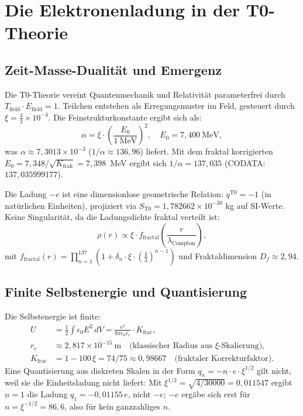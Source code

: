 	\section{Die Elektronenladung in der T0-Theorie}
	\label{sec:t0-ladung}
	
	\subsection{Zeit-Masse-Dualität und Emergenz}
	Die T0-Theorie vereint Quantenmechanik und Relativität parameterfrei durch $T_{\text{field}} \cdot E_{\text{field}} = 1$. Teilchen entstehen als Erregungsmuster im Feld, gesteuert durch $\xi = \frac{4}{3} \times 10^{-4}$. Die Feinstrukturkonstante ergibt sich als:
	\begin{equation}
		\alpha = \xi \cdot \left( \frac{E_0}{1~\mathrm{MeV}} \right)^2, \quad E_0 = 7{,}400~\mathrm{MeV},
	\end{equation}
	was $\alpha \approx 7{,}3013 \times 10^{-3}$ ($1/\alpha \approx 136{,}96$) liefert. Mit dem fraktal korrigierten $E_0 = 7{,}348/\sqrt{K_{\text{frak}}} = 7{,}398$~MeV ergibt sich $1/\alpha = 137{,}035$ (CODATA: $137{,}035999177$).
	
	Die Ladung $-e$ ist eine dimensionlose geometrische Relation: $q^{\mathrm{T0}} = -1$ (in natürlichen Einheiten), projiziert via $S_{\mathrm{T0}} = 1{,}782662 \times 10^{-30}$ kg auf SI-Werte. Keine Singularität, da die Ladungsdichte fraktal verteilt ist:
	\begin{equation}
		\rho(r) \propto \xi \cdot f_{\text{fractal}}\left( \frac{r}{\lambda_{\text{Compton}}} \right),
	\end{equation}
	mit $f_{\text{fractal}}(r) = \prod_{n=1}^{137} \left(1 + \delta_n \cdot \xi \cdot \left(\frac{4}{3}\right)^{n-1}\right)$ und Fraktaldimension $D_f \approx 2{,}94$.
	
	\subsection{Finite Selbstenergie und Quantisierung}
	Die Selbstenergie ist finite:
	\begin{align}
		U &= \frac{1}{2} \int \epsilon_0 E^2 \, dV = \frac{e^2}{8\pi \epsilon_0 r_e} \cdot K_{\text{frac}}, \\
		r_e &\approx 2{,}817 \times 10^{-15}~\mathrm{m} \quad \text{(klassischer Radius aus $\xi$-Skalierung)}, \\
		K_{\text{frac}} &= 1 - 100\,\xi = 74/75 \approx 0{,}98667 \quad \text{(fraktaler Korrekturfaktor)}.
	\end{align}
	Eine Quantisierung aus diskreten Skalen in der Form $q_n = -n \cdot e \cdot \xi^{1/2}$ gilt nicht, weil sie die Einheitsladung nicht liefert: Mit $\xi^{1/2} = \sqrt{4/30000} = 0{,}011547$ ergibt $n = 1$ die Ladung $q_1 = -0{,}01155\,e$, nicht $-e$; $-e$ ergäbe sich erst für $n = \xi^{-1/2} = 86{,}6$, also für kein ganzzahliges $n$.
	
